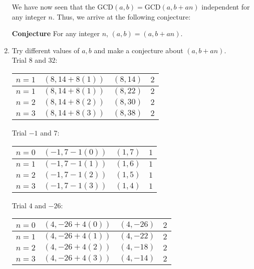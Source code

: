 \documentclass[12pt]{article}
\newenvironment{problem}[2][Problem]{\begin{trivlist}
\item[\hskip \labelsep {\bfseries #1}\hskip \labelsep {\bfseries #2.}]}{\end{trivlist}}
\newenvironment{nscenter}
 {\parskip=0pt\par\nopagebreak\centering}
 {\par\noindent\ignorespacesafterend}
\begin{document}
\begin{problem}{4}
\begin{enumerate}[label=(\alph*)]
\noindent
We have now seen that the GCD$(a, b)=$GCD$(a, b+an)$ independent for any integer $n$. Thus, we arrive at the following conjecture:

\vspace{.2cm}

\begin{nscenter}
\textbf{Conjecture} %
For any integer $n$, $(a,b)=(a,b+an)$.
\end{nscenter}

\item Try different values of $a,b$ and make a conjecture about $(a, b+an)$. \\

Trial $8$ and $32$:

\begin{center}
\begin{tabu} to .85\textwidth { | X[c] | X[c] | X[c] | X[c] |}
\hline
 $n=1$ & $(8, 14+8(1))$ & $(8, 14)$ & $2$\\
\hline
 $n=1$ & $(8, 14+8(1))$ & $(8, 22)$ & $2$\\
\hline
 $n=2$ & $(8, 14+8(2))$ & $(8, 30)$ & $2$\\
 \hline
 $n=3$ & $(8, 14+8(3))$ & $(8, 38)$ & $2$\\
 \hline
\end{tabu}
\end{center}

Trial $-1$ and $7$:

\begin{center}
\begin{tabu} to 0.7\textwidth { | X[c] | X[c] | X[c] | X[c] |}
 \hline
 $n=0$ & $(-1, 7-1(0))$ & $(1, 7)$ & $1$\\
 \hline
 $n=1$ & $(-1, 7-1(1))$ & $(1, 6)$ & $1$\\
 \hline
 $n=2$ & $(-1, 7-1(2))$ & $(1, 5)$ & $1$\\
\hline
 $n=3$ & $(-1, 7-1(3))$ & $(1, 4)$ & $1$\\
\hline
\end{tabu}
\end{center}

Trial $4$ and $-26$:

\begin{center}
\begin{tabu} to 0.8\textwidth { | X[c] | X[c] | X[c] | X[c] |}
 \hline
 $n=0$ & $(4, -26+4(0))$ & $(4, -26)$ & $2$\\
 \hline
 $n=1$ & $(4, -26+4(1))$ & $(4, -22)$ & $2$\\
\hline
 $n=2$ & $(4, -26+4(2))$ & $(4, -18)$ & $2$\\
 \hline
 $n=3$ & $(4, -26+4(3))$ & $(4, -14)$ & $2$\\
 \hline
\end{tabu}
\end{center}


\end{enumerate}
\end{problem}
\end{document}
